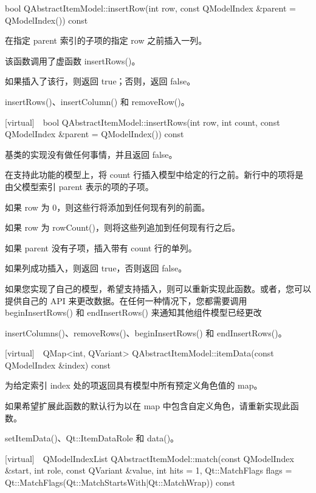 bool QAbstractItemModel::insertRow(int row, const QModelIndex \&parent = QModelIndex()) const

在指定 parent 索引的子项的指定 row 之前插入一列。

\begin{notice}
该函数调用了虚函数 insertRows()。
\end{notice}
  
如果插入了该行，则返回 true；否则，返回 false。

\begin{seeAlso}
insertRows()、insertColumn() 和 removeRow()。
\end{seeAlso}

[virtual] bool QAbstractItemModel::insertRows(int row, int count, const QModelIndex \&parent = QModelIndex()) const

\begin{notice}
基类的实现没有做任何事情，并且返回 false。
\end{notice}

在支持此功能的模型上，将 count 行插入模型中给定的行之前。新行中的项将是由父模型索引 parent 表示的项的子项。

如果 row 为 0，则这些行将添加到任何现有列的前面。

如果 row 为 rowCount()，则将这些列追加到任何现有行之后。

如果 parent 没有子项，插入带有 count 行的单列。

如果列成功插入，则返回 true，否则返回 false。

如果您实现了自己的模型，希望支持插入，则可以重新实现此函数。或者，您可以提供自己的 API 来更改数据。在任何一种情况下，您都需要调用 beginInsertRows() 和 endInsertRows() 来通知其他组件模型已经更改

\begin{seeAlso}
insertColumns()、removeRows()、beginInsertRows() 和 endInsertRows()。
\end{seeAlso}

[virtual] QMap<int, QVariant> QAbstractItemModel::itemData(const QModelIndex \&index) const

为给定索引 index 处的项返回具有模型中所有预定义角色值的 map。

如果希望扩展此函数的默认行为以在 map 中包含自定义角色，请重新实现此函数。

\begin{seeAlso}
setItemData()、Qt::ItemDataRole 和 data()。
\end{seeAlso}
  
[virtual] QModelIndexList QAbstractItemModel::match(const QModelIndex \&start, int role, const QVariant \&value, int hits = 1, Qt::MatchFlags flags = Qt::MatchFlags(Qt::MatchStartsWith|Qt::MatchWrap)) const

